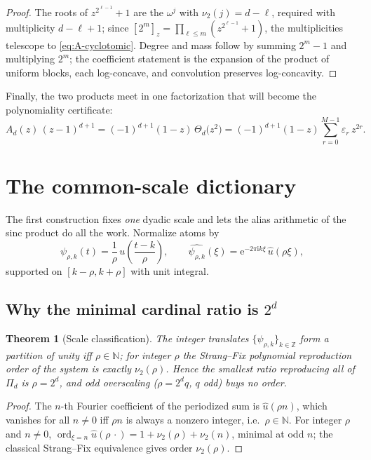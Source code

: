 \documentclass[11pt,oneside]{article}
\numberwithin{equation}{section}
\newtheorem{theorem}{Theorem}[section]
\theoremstyle{definition}
\theoremstyle{remark}
\newcommand{\N}{\mathbb N}
\newcommand{\Z}{\mathbb Z}
\newcommand{\e}{\mathrm e}
\newcommand{\ii}{\mathrm i}
\newcommand{\eps}{\varepsilon}
\newcommand{\vtwo}{\nu_2}
\DeclareMathOperator{\ord}{ord}
\newcommand{\ThetaTM}{\Theta}
\newcommand{\PiD}{\Pi_d}
\begin{document}
\begin{proof}
The roots of $z^{2^{\ell-1}}+1$ are the $\omega^{j}$ with
$\vtwo(j)=d-\ell$, required with multiplicity $d-\ell+1$; since
$[2^{m}]_z=\prod_{\ell\le m}(z^{2^{\ell-1}}+1)$, the multiplicities
telescope to \eqref{eq:A-cyclotomic}.  Degree and mass follow by
summing $2^{m}-1$ and multiplying $2^{m}$; the coefficient statement
is the expansion of the product of uniform blocks, each log-concave,
and convolution preserves log-concavity.
\end{proof}

Finally, the two products meet in one factorization that will become
the polynomiality certificate:
\begin{equation}
 A_d(z)\,(z-1)^{d+1}
 =(-1)^{d+1}(1-z)\,\ThetaTM_d\bigl(z^{2}\bigr)
 =(-1)^{d+1}(1-z)\sum_{r=0}^{M-1}\eps_r\,z^{2r}.
 \label{eq:TM-factor}
\end{equation}

\section{The common-scale dictionary}
\label{sec:dictionary}

The first construction fixes \emph{one} dyadic scale and lets the
alias arithmetic of the sinc product do all the work.  Normalize atoms
by
\begin{equation}
 \psi_{\rho,k}(t)=\frac1\rho\,u\!\left(\frac{t-k}{\rho}\right),
 \qquad
 \widehat{\psi_{\rho,k}}(\xi)=\e^{-2\pi\ii k\xi}\,\widehat u(\rho\xi),
 \label{eq:psi-def}
\end{equation}
supported on $[k-\rho,k+\rho]$ with unit integral.

\subsection{Why the minimal cardinal ratio is $2^{d}$}

\begin{theorem}[Scale classification]
\label{thm:scale-classification}
The integer translates $\{\psi_{\rho,k}\}_{k\in\Z}$ form a partition
of unity iff $\rho\in\N$; for integer $\rho$ the Strang--Fix
polynomial reproduction order of the system is exactly
$\vtwo(\rho)$.  Hence the smallest ratio reproducing all of $\PiD$ is
$\rho=2^{d}$, and odd overscaling ($\rho=2^{d}q$, $q$ odd) buys no
order.
\end{theorem}

\begin{proof}
The $n$-th Fourier coefficient of the periodized sum is
$\widehat u(\rho n)$, which vanishes for all $n\ne0$ iff $\rho n$ is
always a nonzero integer, i.e.\ $\rho\in\N$.  For integer $\rho$ and
$n\ne0$, $\ord_{\xi=n}\widehat u(\rho\,\cdot)
=1+\vtwo(\rho)+\vtwo(n)$, minimal at odd $n$; the classical
Strang--Fix equivalence \cite{StrangFix1973,Jia1998} gives order
$\vtwo(\rho)$.
\end{proof}
\end{document}
